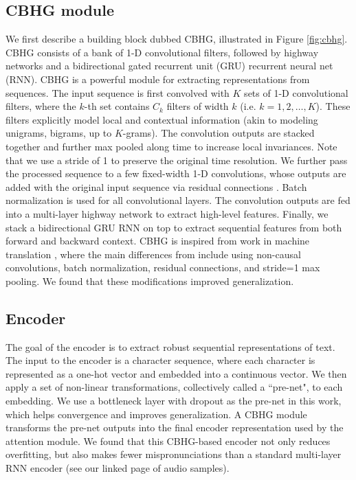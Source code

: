 \documentclass{article} \usepackage{iclr2017_conference,times}
\begin{document}
\subsection{CBHG module}
We first describe a building block dubbed CBHG, illustrated in Figure \ref{fig:cbhg}. CBHG consists of a bank of 1-D convolutional filters, followed by highway networks \citep{srivastava2015highway} and a bidirectional  gated recurrent unit (GRU) \citep{chung2014empirical} recurrent neural net (RNN). CBHG is a powerful module for extracting representations from sequences. The input sequence is first convolved with $K$ sets of 1-D convolutional filters, where the $k$-th set contains $C_k$ filters of width $k$ (i.e. $k=1,2, \ldots, K$). These filters explicitly model local and contextual information (akin to modeling unigrams, bigrams, up to $K$-grams). The convolution outputs are stacked together and further max pooled along time to increase local invariances. Note that we use a stride of 1 to preserve the original time resolution. We further pass the processed sequence to a few fixed-width 1-D convolutions, whose outputs are added with the original input sequence via residual connections \citep{he2016deep}. Batch normalization \citep{ioffe2015batch} is used for all convolutional layers. The convolution outputs are fed into a multi-layer highway network to extract high-level features. Finally, we stack a bidirectional GRU RNN on top to extract sequential features from both forward and backward context. CBHG is inspired from work in machine translation \citep{lee2016fully}, where the main differences from \cite{lee2016fully} include using non-causal convolutions, batch normalization, residual connections, and stride=1 max pooling. We found that these modifications improved generalization. 

\subsection{Encoder}
The goal of the encoder is to extract robust sequential representations of text. The input to the encoder is a character sequence, where each character is represented as a one-hot vector and embedded into a continuous vector. We then apply a set of non-linear transformations, collectively called a ``pre-net", to each embedding. We use a bottleneck layer with dropout as the pre-net in this work, which helps convergence and improves generalization. A CBHG module transforms the pre-net outputs into the final encoder representation used by the attention module.  We found that this CBHG-based encoder not only reduces overfitting, but also makes fewer mispronunciations than a standard multi-layer RNN encoder (see our linked page of audio samples).
\end{document}
